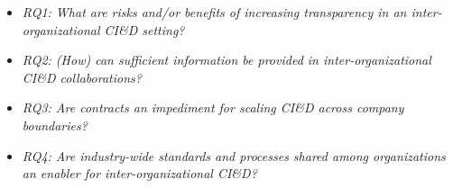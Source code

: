 \begin{itemize}
\item {\em RQ1:  What are risks and/or benefits of increasing %
transparency {in an inter-organizational CI\&D setting}?}
\item {\em RQ2: {(How) can sufficient information be provided in inter-organizational CI\&D collaborations?}
} 
\item {\em RQ3: Are contracts an impediment for scaling %
{CI\&D} across company boundaries?} %
\item {\em RQ4: Are industry-wide standards and processes shared among organizations an enabler{ for inter-organizational CI\&D}?}
\end{itemize}

